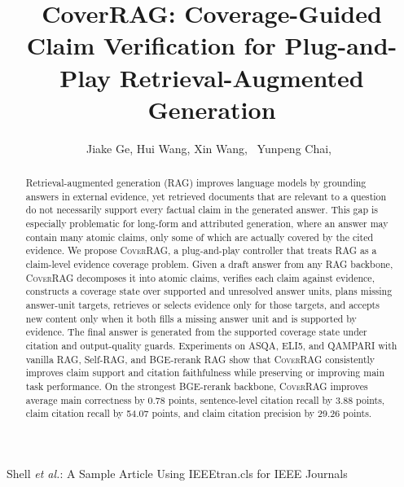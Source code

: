 \documentclass[lettersize,journal]{IEEEtran}
\begin{document}
\title{CoverRAG: Coverage-Guided Claim Verification for Plug-and-Play Retrieval-Augmented Generation}

\author{Jiake Ge,
        Hui Wang,
        Xin Wang,~
        Yunpeng Chai,~
        


}

%
{Shell \MakeLowercase{\textit{et al.}}: A Sample Article Using IEEEtran.cls for IEEE Journals}

\maketitle

\begin{abstract}
Retrieval-augmented generation (RAG) improves language models by grounding answers in external evidence, yet retrieved documents that are relevant to a question do not necessarily support every factual claim in the generated answer. This gap is especially problematic for long-form and attributed generation, where an answer may contain many atomic claims, only some of which are actually covered by the cited evidence. We propose \textsc{CoverRAG}, a plug-and-play controller that treats RAG as a claim-level evidence coverage problem. Given a draft answer from any RAG backbone, \textsc{CoverRAG} decomposes it into atomic claims, verifies each claim against evidence, constructs a coverage state over supported and unresolved answer units, plans missing answer-unit targets, retrieves or selects evidence only for those targets, and accepts new content only when it both fills a missing answer unit and is supported by evidence. The final answer is generated from the supported coverage state under citation and output-quality guards. Experiments on ASQA, ELI5, and QAMPARI with vanilla RAG, Self-RAG, and BGE-rerank RAG show that \textsc{CoverRAG} consistently improves claim support and citation faithfulness while preserving or improving main task performance. On the strongest BGE-rerank backbone, \textsc{CoverRAG} improves average main correctness by 0.78 points, sentence-level citation recall by 3.88 points, claim citation recall by 54.07 points, and claim citation precision by 29.26 points.
\end{abstract}
\end{document}
